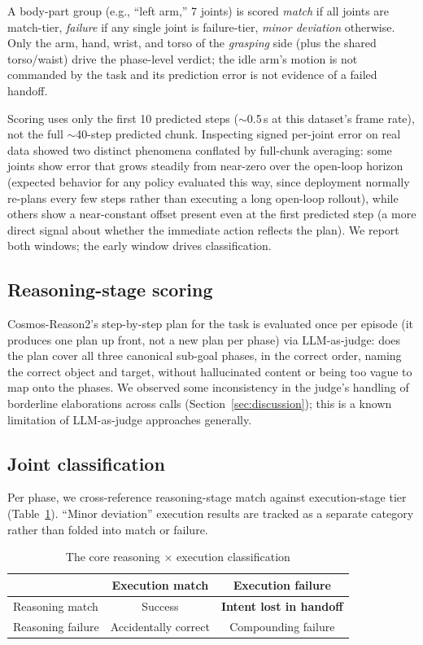 \documentclass[conference]{IEEEtran}
\begin{document}
A body-part group (e.g., ``left arm,'' 7 joints) is scored \emph{match} if all joints are
match-tier, \emph{failure} if any single joint is failure-tier, \emph{minor deviation}
otherwise. Only the arm, hand, wrist, and torso of the \emph{grasping} side (plus the
shared torso/waist) drive the phase-level verdict; the idle arm's motion is not commanded
by the task and its prediction error is not evidence of a failed handoff.

Scoring uses only the first 10 predicted steps ($\sim$0.5\,s at this dataset's frame
rate), not the full $\sim$40-step predicted chunk. Inspecting signed per-joint error on
real data showed two distinct phenomena conflated by full-chunk averaging: some joints
show error that grows steadily from near-zero over the open-loop horizon (expected
behavior for any policy evaluated this way, since deployment normally re-plans every few
steps rather than executing a long open-loop rollout), while others show a near-constant
offset present even at the first predicted step (a more direct signal about whether the
immediate action reflects the plan). We report both windows; the early window drives
classification.

\subsection{Reasoning-stage scoring}

Cosmos-Reason2's step-by-step plan for the task is evaluated once per episode (it
produces one plan up front, not a new plan per phase) via LLM-as-judge: does the plan
cover all three canonical sub-goal phases, in the correct order, naming the correct
object and target, without hallucinated content or being too vague to map onto the
phases. We observed some inconsistency in the judge's handling of borderline elaborations
across calls (Section~\ref{sec:discussion}); this is a known limitation of LLM-as-judge
approaches generally.

\subsection{Joint classification}

Per phase, we cross-reference reasoning-stage match against execution-stage tier
(Table~\ref{tab:classification}). ``Minor deviation'' execution results are tracked as a
separate category rather than folded into match or failure.

\begin{table}[htbp]
\centering
\caption{The core reasoning $\times$ execution classification}
\label{tab:classification}
\begin{tabular}{@{}lcc@{}}
\toprule
 & Execution match & Execution failure \\
\midrule
Reasoning match & Success & \textbf{Intent lost in handoff} \\
Reasoning failure & Accidentally correct & Compounding failure \\
\bottomrule
\end{tabular}
\end{table}
\end{document}
